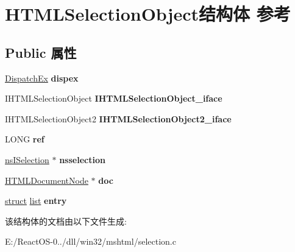 \hypertarget{struct_h_t_m_l_selection_object}{}\section{H\+T\+M\+L\+Selection\+Object结构体 参考}
\label{struct_h_t_m_l_selection_object}
\subsection*{Public 属性}
\begin{DoxyCompactItemize}
\item 
\mbox{\label{struct_h_t_m_l_selection_object_a3b5c640ee500d3d9f8b87981e1131577}} 
\hyperlink{struct_dispatch_ex}{Dispatch\+Ex} {\bfseries dispex}
\item 
\mbox{\label{struct_h_t_m_l_selection_object_a7c173ceb825daa04ffb9f8bc9a24feba}} 
I\+H\+T\+M\+L\+Selection\+Object {\bfseries I\+H\+T\+M\+L\+Selection\+Object\+\_\+iface}
\item 
\mbox{\label{struct_h_t_m_l_selection_object_a4321cdcd42c8d0ffc3ed9010066fa694}} 
I\+H\+T\+M\+L\+Selection\+Object2 {\bfseries I\+H\+T\+M\+L\+Selection\+Object2\+\_\+iface}
\item 
\mbox{\label{struct_h_t_m_l_selection_object_af9faf1e909372bc98a104e7f3d03d054}} 
L\+O\+NG {\bfseries ref}
\item 
\mbox{\label{struct_h_t_m_l_selection_object_ac5a33ba1ffe0370dfa4472171c6a5c90}} 
\hyperlink{interfacens_i_selection}{ns\+I\+Selection} $\ast$ {\bfseries nsselection}
\item 
\mbox{\label{struct_h_t_m_l_selection_object_ae33b3103d564a173aa024d40c0c945ad}} 
\hyperlink{struct_h_t_m_l_document_node}{H\+T\+M\+L\+Document\+Node} $\ast$ {\bfseries doc}
\item 
\mbox{\label{struct_h_t_m_l_selection_object_aec702287d1168369a1aad8dd6cd34d52}} 
\hyperlink{interfacestruct}{struct} \hyperlink{classlist}{list} {\bfseries entry}
\end{DoxyCompactItemize}


该结构体的文档由以下文件生成\+:\begin{DoxyCompactItemize}
\item 
E\+:/\+React\+O\+S-\/0../dll/win32/mshtml/selection.\+c\end{DoxyCompactItemize}
